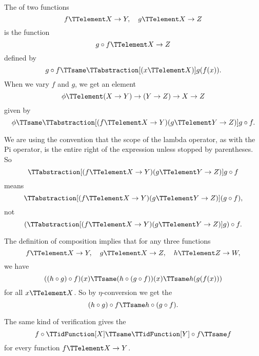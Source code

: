 \documentclass{article}
\begin{document}
The  of two functions
\begin{equation*}
  f \TTelement X \to Y, \quad
  g \TTelement X \to Z
\end{equation*}
is the function
\begin{equation*}
  g \circ f \TTelement X \to Z
\end{equation*}
defined by
\begin{equation*}
  g \circ f \TTsame \TTabstraction[(x \TTelement X)] g(f(x)).
\end{equation*}
When we vary $f$ and $g$, we get an element
\begin{equation*}
  \phi \TTelement (X \to Y) \to (Y \to Z) \to X \to Z
\end{equation*}
given by
\begin{equation*}
  \phi \TTsame
  \TTabstraction[(f \TTelement X \to Y) (g \TTelement Y \to Z)]
  g \circ f.
\end{equation*}

We are using the convention that the scope of the lambda operator, as
with the Pi operator, is the entire right of the expression unless
stopped by parentheses.  So
\begin{equation*}
  \TTabstraction[(f \TTelement X \to Y) (g \TTelement Y \to Z)]
  g \circ f
\end{equation*}
means
\begin{equation*}
  \TTabstraction[(f \TTelement X \to Y) (g \TTelement Y \to Z)]
  (g \circ f),
\end{equation*}
not
\begin{equation*}
  (\TTabstraction[(f \TTelement X \to Y) (g \TTelement Y \to Z)]
  g) \circ f.
\end{equation*}

The definition of composition implies that for any three functions
\begin{equation*}
  f \TTelement X \to Y, \quad
  g \TTelement X \to Z, \quad
  h \TTelement Z \to W,
\end{equation*}
we have
\begin{equation*}
  ((h \circ g) \circ f) (x) \TTsame
  (h \circ (g \circ f)) (x) \TTsame
  h(g(f(x)))
\end{equation*}
for all $x \TTelement X$.  So by $\eta$-conversion we get the
\begin{equation*}
  (h \circ g) \circ f \TTsame h \circ (g \circ f).
\end{equation*}

The same kind of verification gives the 
\begin{equation*}
  f \circ \TTidFunction[X] \TTsame
  \TTidFunction[Y] \circ f \TTsame
  f
\end{equation*}
for every function $f \TTelement X \to Y$.
\end{document}
